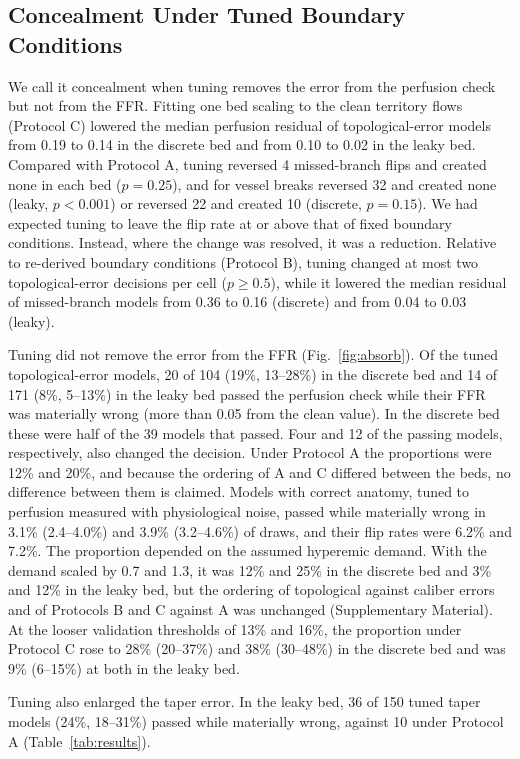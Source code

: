 \documentclass[journal]{IEEEtran}
\begin{document}
\subsection{Concealment Under Tuned Boundary Conditions}
We call it concealment when tuning removes the error from the perfusion check but not from the FFR. Fitting one bed
scaling to the clean territory flows (Protocol C) lowered the median perfusion residual of topological-error models
from 0.19 to 0.14 in the discrete bed and from 0.10 to 0.02 in the leaky bed. Compared with Protocol A, tuning reversed 4 missed-branch flips and created none in each bed ($p = 0.25$), and for
vessel breaks reversed 32 and created none (leaky, $p < 0.001$) or reversed 22 and created 10 (discrete, $p = 0.15$).
We had expected tuning to leave the flip rate at or above that of fixed boundary conditions. Instead, where the
change was resolved, it was a reduction. Relative to re-derived boundary conditions (Protocol B), tuning changed at
most two topological-error decisions per cell ($p \geq 0.5$), while it lowered the median residual of missed-branch
models from 0.36 to 0.16 (discrete) and from 0.04 to 0.03 (leaky).

Tuning did not remove the error from the FFR (Fig.~\ref{fig:absorb}). Of the tuned topological-error models, 20 of
104 (19\%, 13--28\%) in the discrete bed and 14 of 171 (8\%, 5--13\%) in the leaky bed passed the perfusion check
while their FFR was materially wrong (more than 0.05 from the clean value). In the discrete bed these were half of
the 39 models that passed. Four and 12 of the passing models, respectively, also changed the decision. Under Protocol A the
proportions were 12\% and 20\%, and because the ordering of A and C differed between the beds, no difference
between them is claimed. Models with
correct anatomy, tuned to perfusion measured with physiological noise, passed while materially wrong in 3.1\% (2.4--4.0\%) and 3.9\% (3.2--4.6\%) of draws, and their flip rates were 6.2\% and 7.2\%.
The proportion depended on the assumed hyperemic demand. With the demand scaled by 0.7 and 1.3, it was 12\% and
25\% in the discrete bed and 3\% and 12\% in the leaky bed, but the ordering of topological against caliber errors
and of Protocols B and C against A was unchanged (Supplementary Material). At
the looser validation thresholds of 13\% and 16\%, the proportion under Protocol C rose to 28\% (20--37\%) and 38\%
(30--48\%) in the discrete bed and was 9\% (6--15\%) at both in the leaky bed.

Tuning also enlarged the taper error. In the leaky bed, 36 of 150 tuned taper models (24\%, 18--31\%) passed while
materially wrong, against 10 under Protocol A (Table~\ref{tab:results}).
\end{document}
